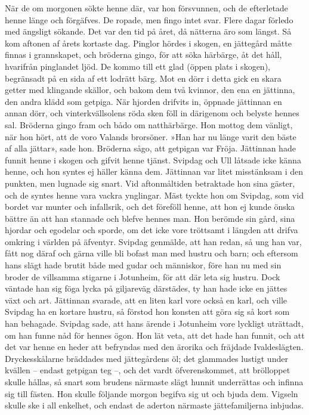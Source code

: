 När de om morgonen sökte henne där, var hon försvunnen, och de
efterletade henne länge och förgäfves. De ropade, men fingo intet svar.
Flere dagar förledo med ängsligt sökande. Det var den tid på året, då
nätterna äro som längst. Så kom aftonen af årets kortaste dag. Pinglor
hördes i skogen, en jättegård måtte finnas i grannskapet, och bröderna
gingo, för att söka härbärge, åt det håll, hvarifrån pinglandet ljöd. De
kommo till ett glad (öppen plats i skogen), begränsadt på en sida af ett
lodrätt bärg. Mot en dörr i detta gick en skara getter med klingande
skällor, och bakom dem två kvinnor, den ena en jättinna, den andra klädd
som getpiga.
\protect\hypertarget{lb1625905.xhtmlux5cux23start111}{}{}\protect\hypertarget{lb1625905.xhtmlux5cux23start111-a}{}{}\protect\hypertarget{lb1625905.xhtmlux5cux23start111-b}{}{}\protect\hypertarget{lb1625905.xhtmlux5cux23start111-c}{}{}\protect\hypertarget{lb1625905.xhtmlux5cux23start111-d}{}{}
När hjorden drifvits in, öppnade jättinnan en annan dörr, och
vinterkvällsolens röda sken föll in därigenom och belyste hennes sal.
Bröderna gingo fram och bådo om natthärbärge. Hon mottog dem vänligt,
när hon hört, att de voro Valands brorsöner. »Han har nu länge varit den
bäste af alla jättar», sade hon. Bröderna sågo, att getpigan var Fröja.
Jättinnan hade funnit henne i skogen och gifvit henne tjänst. Svipdag
och Ull låtsade icke känna henne, och hon syntes ej häller känna dem.
Jättinnan var litet misstänksam i den punkten, men lugnade sig snart.
Vid aftonmåltiden betraktade hon sina gäster, och de syntes henne vara
vackra ynglingar. Mäst tyckte hon om Svipdag, som vid bordet var munter
och infallsrik, och det föreföll henne, att hon ej kunde önska bättre än
att han stannade och blefve hennes man. Hon berömde sin gård, sina
hjordar och egodelar och sporde, om det icke vore tröttsamt i längden
att drifva omkring i världen på äfventyr. Svipdag genmälde, att han
redan, så ung han var, fått nog däraf och gärna ville bli bofast man med
hustru och barn; och eftersom hans slägt hade brutit både med gudar och
människor, före han nu med sin broder de villsamma stigarne i Jotunheim,
för att där leta sig hustru. Dock väntade han sig föga lycka på
giljareväg därstädes, ty han hade icke en jättes växt och art. Jättinnan
svarade, att en liten karl vore också en karl, och ville Svipdag ha en
kortare hustru, så förstod hon konsten att göra sig så kort som han
behagade. Svipdag sade, att hans ärende i Jotunheim vore lyckligt
uträttadt, om han funne nåd för hennes ögon. Hon lät veta, att det hade
han funnit, och att det var henne en heder att befryndas med den ärorika
och fräjdade Ivaldeslägten. Dryckesskålarne bräddades med jättegårdens
öl; det glammades lustigt under kvällen -- endast getpigan teg --, och
det vardt öfverenskommet, att brölloppet skulle hållas, så snart som
brudens närmaste slägt hunnit underrättas och infinna sig till fästen.
Hon skulle följande morgon begifva sig ut och bjuda dem. Vigseln skulle
ske i all enkelhet, och endast de aderton närmaste jättefamiljerna
inbjudas.

